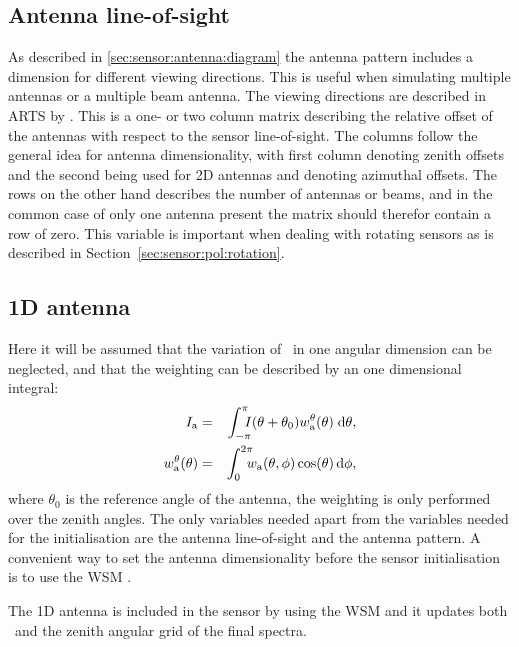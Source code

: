 \subsection{Antenna line-of-sight}
As described in \ref{sec:sensor:antenna:diagram} the antenna pattern includes a dimension for different viewing directions. This is useful when simulating multiple antennas or a multiple beam antenna. The viewing directions are described in ARTS by . This is a one- or two column matrix describing the relative offset of the antennas with respect to the sensor line-of-sight. The columns follow the general idea for antenna dimensionality, with first column denoting zenith offsets and the second being used for 2D antennas and denoting azimuthal offsets. The rows on the other hand describes the number of antennas or beams, and in the common case of only one antenna present the matrix should therefor contain a row of zero.
This variable is important when dealing with rotating sensors as is described in Section~\ref{sec:sensor:pol:rotation}.

\subsection{1D antenna}
Here it will be assumed that the variation of \Mpi\ in one angular dimension can be neglected, and that the weighting can be described by an one dimensional integral:
\begin{eqnarray}
\label{eq:sensor:antenna:1D}
  \aMpi{\mathrm{a}} &=& \int_{-\pi}^\pi\!\!\!\!I(\theta+\theta_0) 
  w_\mathrm{a}^\theta(\theta)\;\mathrm{d}\theta,\\
  w_\mathrm{a}^\theta(\theta) &=& \int_0^{2\pi}\!\!\!\!
  w_\mathrm{a}(\theta,\phi)\cos(\theta)\,\mathrm{d}\phi,
\end{eqnarray}
where $\theta_0$ is the reference angle of the antenna, the weighting is only performed over the zenith angles. The only variables needed apart from the variables needed for the initialisation are the antenna line-of-sight and the antenna pattern. A convenient way to set the antenna dimensionality before the sensor initialisation is to use the WSM .

The 1D antenna is included in the sensor by using the WSM  and it updates both \SnsMtr\ and the zenith angular grid of the final spectra.


